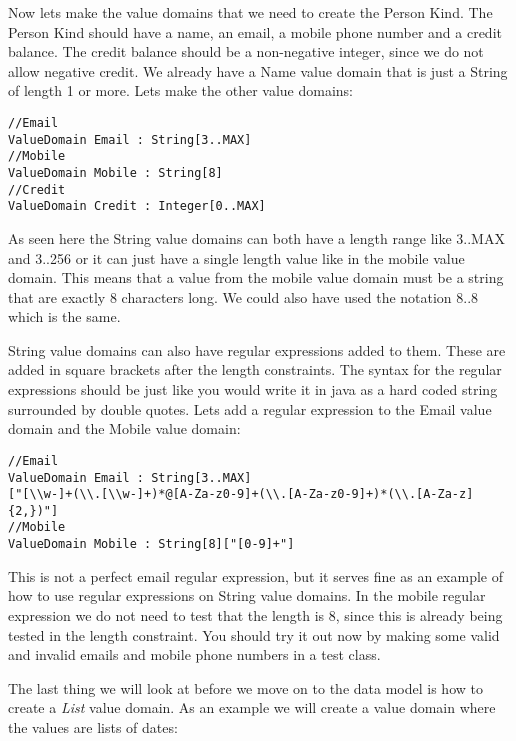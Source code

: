 Now lets make the value domains that we need to create the Person
Kind. The Person Kind should have a name, an email, a mobile phone
number and a credit balance. The credit balance should be a non-negative
integer, since we do not allow negative credit. We already have a
Name value domain that is just a String of length 1 or more. Lets
make the other value domains:

\begin{lstlisting}[basicstyle={\scriptsize}]
//Email
ValueDomain Email : String[3..MAX]
//Mobile
ValueDomain Mobile : String[8]
//Credit
ValueDomain Credit : Integer[0..MAX]
\end{lstlisting}


As seen here the String value domains can both have a length range
like 3..MAX and 3..256 or it can just have a single length value like
in the mobile value domain. This means that a value from the mobile
value domain must be a string that are exactly 8 characters long.
We could also have used the notation 8..8 which is the same.

String value domains can also have regular expressions added to them.
These are added in square brackets after the length constraints. The
syntax for the regular expressions should be just like you would write
it in java as a hard coded string surrounded by double quotes. Lets
add a regular expression to the Email value domain and the Mobile
value domain:

\begin{lstlisting}[basicstyle={\scriptsize}]
//Email
ValueDomain Email : String[3..MAX]
["[\\w-]+(\\.[\\w-]+)*@[A-Za-z0-9]+(\\.[A-Za-z0-9]+)*(\\.[A-Za-z]{2,})"]
//Mobile
ValueDomain Mobile : String[8]["[0-9]+"]
\end{lstlisting}


This is not a perfect email regular expression, but it serves fine
as an example of how to use regular expressions on String value domains.
In the mobile regular expression we do not need to test that the length
is 8, since this is already being tested in the length constraint.
You should try it out now by making some valid and invalid emails
and mobile phone numbers in a test class.

The last thing we will look at before we move on to the data model
is how to create a \emph{List} value domain. As an example we will
create a value domain where the values are lists of dates:

